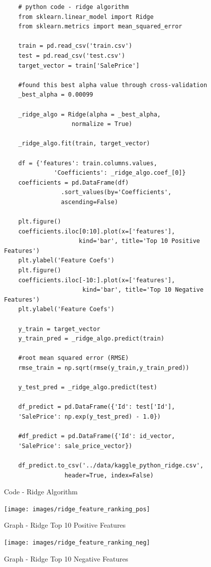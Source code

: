 \documentclass[sigconf]{acmart}
\begin{document}
	\begin{figure}[htb]
	\begin{verbatim}
	# python code - ridge algorithm
	from sklearn.linear_model import Ridge
	from sklearn.metrics import mean_squared_error
	
	train = pd.read_csv('train.csv')
	test = pd.read_csv('test.csv')
	target_vector = train['SalePrice']
	
	#found this best alpha value through cross-validation
	_best_alpha = 0.00099
	
	_ridge_algo = Ridge(alpha = _best_alpha, 
	               normalize = True)		
	               	
	_ridge_algo.fit(train, target_vector)   
	
	df = {'features': train.columns.values, 
	          'Coefficients': _ridge_algo.coef_[0]}	          
	coefficients = pd.DataFrame(df)
	            .sort_values(by='Coefficients', 
	            ascending=False)
	            
	plt.figure()
	coefficients.iloc[0:10].plot(x=['features'], 
	                 kind='bar', title='Top 10 Positive Features')	                 
	plt.ylabel('Feature Coefs')	
	plt.figure()
	coefficients.iloc[-10:].plot(x=['features'], 
	                  kind='bar', title='Top 10 Negative Features')
	plt.ylabel('Feature Coefs')
	
	y_train = target_vector
	y_train_pred = _ridge_algo.predict(train)
	
	#root mean squared error (RMSE)
	rmse_train = np.sqrt(rmse(y_train,y_train_pred))	
	
	y_test_pred = _ridge_algo.predict(test)
	
	df_predict = pd.DataFrame({'Id': test['Id'], 
	'SalePrice': np.exp(y_test_pred) - 1.0})
	
	#df_predict = pd.DataFrame({'Id': id_vector, 
	'SalePrice': sale_price_vector})
	
	df_predict.to_csv('../data/kaggle_python_ridge.csv',
				 header=True, index=False)	
	\end{verbatim}
	\caption{Code - Ridge Algorithm} \label{c:ridge} 
	\end{figure}
		
	\begin{figure}[htb]
		\centering
		\texttt{[image: images/ridge\_feature\_ranking\_pos]}	
		\caption{Graph - Ridge Top 10 Positive Features} \label{fig:ridge-feature-ranking-pos} 
	\end{figure}

	\begin{figure}[htb]
		\centering
		\texttt{[image: images/ridge\_feature\_ranking\_neg]}	
		\caption{Graph - Ridge Top 10 Negative Features} \label{fig:ridge-feature-ranking-neg} 
	\end{figure}
\end{document}
